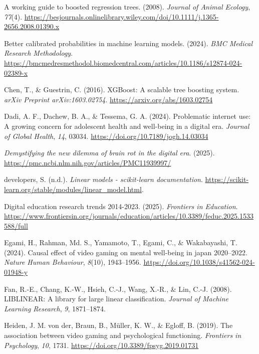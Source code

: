 \documentclass[
  titlepage]{article}
\newlength{\cslhangindent}
\newenvironment{CSLReferences}[2] %
 {\begin{list}{}{%
  \setlength{\itemindent}{0pt}
  \setlength{\leftmargin}{0pt}
  \setlength{\parsep}{0pt}
  \ifodd #1
   \setlength{\leftmargin}{\cslhangindent}
   \setlength{\itemindent}{-1\cslhangindent}
  \fi
  \setlength{\itemsep}{#2\baselineskip}}}
 {\end{list}}
\begin{document}
\label{refs}
\begin{CSLReferences}{1}{0}
A working guide to boosted regression trees. (2008). \emph{Journal of
Animal Ecology}, \emph{77}(4).
\url{https://besjournals.onlinelibrary.wiley.com/doi/10.1111/j.1365-2656.2008.01390.x}

Better calibrated probabilities in machine learning models. (2024).
\emph{BMC Medical Research Methodology}.
\url{https://bmcmedresmethodol.biomedcentral.com/articles/10.1186/s12874-024-02389-x}

Chen, T., \& Guestrin, C. (2016). XGBoost: A scalable tree boosting
system. \emph{arXiv Preprint arXiv:1603.02754}.
\url{https://arxiv.org/abs/1603.02754}

Dadi, A. F., Dachew, B. A., \& Tessema, G. A. (2024). Problematic
internet use: A growing concern for adolescent health and well-being in
a digital era. \emph{Journal of Global Health}, \emph{14}, 03034.
\url{https://doi.org/10.7189/jogh.14.03034}

\emph{Demystifying the new dilemma of brain rot in the digital era}.
(2025). \url{https://pmc.ncbi.nlm.nih.gov/articles/PMC11939997/}

developers, S. (n.d.). \emph{Linear models - scikit-learn
documentation}.
\url{https://scikit-learn.org/stable/modules/linear_model.html}.

Digital education research trends 2014-2023. (2025). \emph{Frontiers in
Education}.
\url{https://www.frontiersin.org/journals/education/articles/10.3389/feduc.2025.1533588/full}

Egami, H., Rahman, Md. S., Yamamoto, T., Egami, C., \& Wakabayashi, T.
(2024). Causal effect of video gaming on mental well-being in japan
2020--2022. \emph{Nature Human Behaviour}, \emph{8}(10), 1943--1956.
\url{https://doi.org/10.1038/s41562-024-01948-y}

Fan, R.-E., Chang, K.-W., Hsieh, C.-J., Wang, X.-R., \& Lin, C.-J.
(2008). LIBLINEAR: A library for large linear classification.
\emph{Journal of Machine Learning Research}, \emph{9}, 1871--1874.

Heiden, J. M. von der, Braun, B., Müller, K. W., \& Egloff, B. (2019).
The association between video gaming and psychological functioning.
\emph{Frontiers in Psychology}, \emph{10}, 1731.
\url{https://doi.org/10.3389/fpsyg.2019.01731}


\end{CSLReferences}
\end{document}
